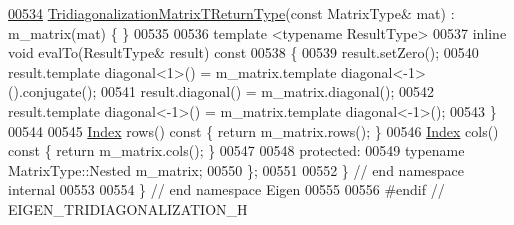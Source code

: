 \begin{DoxyCode}
\hyperlink{struct_eigen_1_1internal_1_1_tridiagonalization_matrix_t_return_type_ac49f3c4df8b40dfa002c6e04e3d1b97f}{00534}     \hyperlink{struct_eigen_1_1internal_1_1_tridiagonalization_matrix_t_return_type_ac49f3c4df8b40dfa002c6e04e3d1b97f}{TridiagonalizationMatrixTReturnType}(\textcolor{keyword}{const} MatrixType& mat) : 
      m\_matrix(mat) \{ \}
00535 
00536     \textcolor{keyword}{template} <\textcolor{keyword}{typename} ResultType>
00537     \textcolor{keyword}{inline} \textcolor{keywordtype}{void} evalTo(ResultType& result)\textcolor{keyword}{ const}
00538 \textcolor{keyword}{    }\{
00539       result.setZero();
00540       result.template diagonal<1>() = m\_matrix.template diagonal<-1>().conjugate();
00541       result.diagonal() = m\_matrix.diagonal();
00542       result.template diagonal<-1>() = m\_matrix.template diagonal<-1>();
00543     \}
00544 
00545     \hyperlink{namespace_eigen_a62e77e0933482dafde8fe197d9a2cfde}{Index} rows()\textcolor{keyword}{ const }\{ \textcolor{keywordflow}{return} m\_matrix.rows(); \}
00546     \hyperlink{namespace_eigen_a62e77e0933482dafde8fe197d9a2cfde}{Index} cols()\textcolor{keyword}{ const }\{ \textcolor{keywordflow}{return} m\_matrix.cols(); \}
00547 
00548   \textcolor{keyword}{protected}:
00549     \textcolor{keyword}{typename} MatrixType::Nested m\_matrix;
00550 \};
00551 
00552 \} \textcolor{comment}{// end namespace internal}
00553 
00554 \} \textcolor{comment}{// end namespace Eigen}
00555 
00556 \textcolor{preprocessor}{#endif // EIGEN\_TRIDIAGONALIZATION\_H}
\end{DoxyCode}
